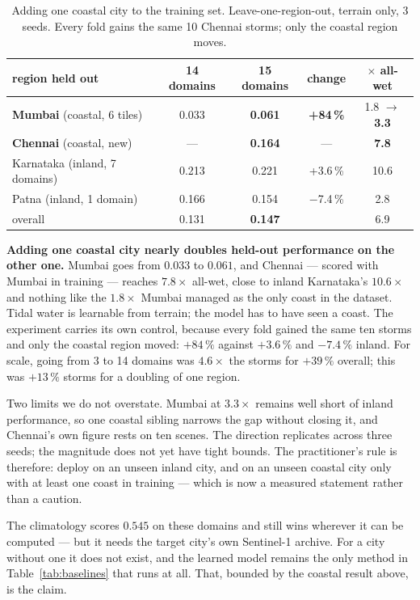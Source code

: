 \documentclass[10pt]{article}
\begin{document}
\begin{table}[t]
\centering\small
\caption{Adding one coastal city to the training set. Leave-one-region-out, terrain only, 3
seeds. Every fold gains the same 10 Chennai storms; only the coastal region moves.}
\label{tab:coastal}
\begin{tabular}{lcccc}
\toprule
region held out & 14 domains & 15 domains & change & $\times$ all-wet \\
\midrule
\textbf{Mumbai} (coastal, 6 tiles)  & 0.033 & \textbf{0.061} & \textbf{+84\,\%} & 1.8 $\to$ \textbf{3.3} \\
\textbf{Chennai} (coastal, new)     & ---   & \textbf{0.164} & ---             & \textbf{7.8} \\
Karnataka (inland, 7 domains)       & 0.213 & 0.221 & +3.6\,\% & 10.6 \\
Patna (inland, 1 domain)            & 0.166 & 0.154 & $-$7.4\,\% & 2.8 \\
\midrule
overall                             & 0.131 & \textbf{0.147} & & 6.9 \\
\bottomrule
\end{tabular}
\end{table}

\textbf{Adding one coastal city nearly doubles held-out performance on the other one.} Mumbai
goes from $0.033$ to $0.061$, and Chennai --- scored with Mumbai in training --- reaches
$7.8\times$ all-wet, close to inland Karnataka's $10.6\times$ and nothing like the $1.8\times$
Mumbai managed as the only coast in the dataset. Tidal water is learnable from terrain; the model
has to have seen a coast. The experiment carries its own control, because every fold gained the
same ten storms and only the coastal region moved: $+84\,\%$ against $+3.6\,\%$ and $-7.4\,\%$
inland. For scale, going from 3 to 14 domains was $4.6\times$ the storms for $+39\,\%$ overall;
this was $+13\,\%$ storms for a doubling of one region.

Two limits we do not overstate. Mumbai at $3.3\times$ remains well short of inland performance,
so one coastal sibling narrows the gap without closing it, and Chennai's own figure rests on ten
scenes. The direction replicates across three seeds; the magnitude does not yet have tight
bounds. The practitioner's rule is therefore: deploy on an unseen inland city, and on an unseen
coastal city only with at least one coast in training --- which is now a measured statement
rather than a caution.

The climatology scores $0.545$ on these domains and still wins wherever it can be computed --- but
it needs the target city's own Sentinel-1 archive. For a city without one it does not exist, and
the learned model remains the only method in Table~\ref{tab:baselines} that runs at all. That,
bounded by the coastal result above, is the claim.
\end{document}
